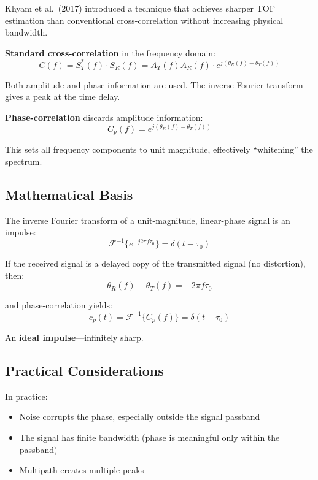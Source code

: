 \documentclass[11pt]{article}
\begin{document}
Khyam et al.\ (2017) introduced a technique that achieves sharper TOF estimation than conventional cross-correlation without increasing physical bandwidth.

\textbf{Standard cross-correlation} in the frequency domain:
\begin{equation}
C(f) = S_T^*(f) \cdot S_R(f) = A_T(f) A_R(f) \cdot e^{j(\theta_R(f) - \theta_T(f))}
\end{equation}

Both amplitude and phase information are used. The inverse Fourier transform gives a peak at the time delay.

\textbf{Phase-correlation} discards amplitude information:
\begin{equation}
C_p(f) = e^{j(\theta_R(f) - \theta_T(f))}
\end{equation}

This sets all frequency components to unit magnitude, effectively ``whitening'' the spectrum.

\subsection{Mathematical Basis}

The inverse Fourier transform of a unit-magnitude, linear-phase signal is an impulse:
\begin{equation}
\mathcal{F}^{-1}\{e^{-j2\pi f \tau_0}\} = \delta(t - \tau_0)
\end{equation}

If the received signal is a delayed copy of the transmitted signal (no distortion), then:
\begin{equation}
\theta_R(f) - \theta_T(f) = -2\pi f \tau_0
\end{equation}

and phase-correlation yields:
\begin{equation}
c_p(t) = \mathcal{F}^{-1}\{C_p(f)\} = \delta(t - \tau_0)
\end{equation}

An \textbf{ideal impulse}---infinitely sharp.

\subsection{Practical Considerations}

In practice:
\begin{itemize}
    \item Noise corrupts the phase, especially outside the signal passband
    \item The signal has finite bandwidth (phase is meaningful only within the passband)
    \item Multipath creates multiple peaks
\end{itemize}
\end{document}
